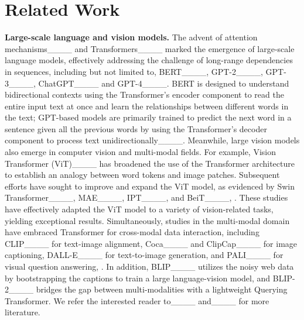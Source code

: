 \section{Related Work}
\label{sec:related}
\noindent \textbf{Large-scale language and vision models.} 
The advent of attention mechanisms____ and Transformers____ marked the emergence of large-scale language models, effectively addressing the challenge of long-range dependencies in sequences, including but not limited to, BERT____, GPT-2____, GPT-3____, ChatGPT____ and GPT-4____. BERT is designed to understand bidirectional contexts using the Transformer's encoder component to read the entire input text at once and learn the relationships between different words in the text; GPT-based models are primarily trained to predict the next word in a sentence given all the previous words by using the Transformer's decoder component to process text unidirectionally____. Meanwhile, large vision models also emerge in computer vision and multi-modal fields. For example, Vision Transformer (ViT)____ has broadened the use of the Transformer architecture to establish an analogy between word tokens and image patches. Subsequent efforts have sought to improve and expand the ViT model, as evidenced by Swin Transformer____, MAE____, IPT____, and BeiT____, \etc. These studies have effectively adapted the ViT model to a variety of vision-related tasks, yielding exceptional results. Simultaneously, studies in the multi-modal domain have embraced Transformer for cross-modal data interaction, including CLIP____ for text-image alignment, Coca____ and ClipCap____ for image captioning, DALL-E____ for text-to-image generation, and PALI____ for visual question answering, \etc. In addition, BLIP____ utilizes the noisy web data by bootstrapping the captions to train a large language-vision model, and BLIP-2____ bridges the gap between multi-modalities with a lightweight Querying Transformer. We refer the interested reader to____ and____ for more literature.

